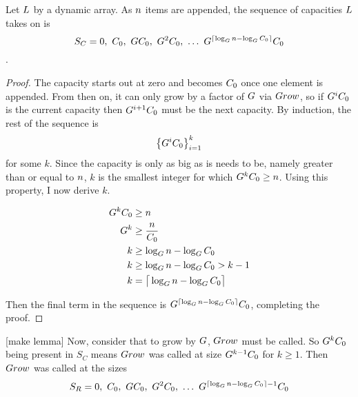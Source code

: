 \begin{lemma}
\label{CapacitySequence}
	Let $L$ by a dynamic array. As $n$ items are appended, the sequence of capacities $L$ takes on is $$S_C = 0,\ \InitCapacity,\ \GrowthFactor\InitCapacity,\ \GrowthFactor^2\InitCapacity,\ \ldots\ \GrowthFactor^{\lceil \log_{\GrowthFactor} \varnitems - \log_{\GrowthFactor} \InitCapacity \rceil}\InitCapacity$$.
\end{lemma}

\begin{proof}
	The capacity starts out at zero and becomes $C_0$ once one element is appended. From then on, it can only grow by a factor of $G$ via $Grow$, so if $G^iC_0$ is the current capacity then $G^{i + 1}C_0$ must be the next capacity. By induction, the rest of the sequence is $$\left\{ G^iC_0 \right\}_{i = 1}^k$$ for some $k$. Since the capacity is only as big as is needs to be, namely greater than or equal to $n$, $k$ is the smallest integer for which $G^kC_0 \geq n$. Using this property, I now derive $k$.
	
	\begin{align*}
	G^kC_0 &\geq n\\
	G^k &\geq \frac{n}{C_0}\\
	k &\geq \log_{G} n - \log_{G} C_0\\
	k &\geq \log_{G} n - \log_{G} C_0 > k - 1\\
	k &= \big\lceil \log_{G} n - \log_{G} C_0 \big\rceil
	\end{align*}
	
	Then the final term in the sequence is $G^{\lceil \log_{G} n - \log_{G} C_0 \rceil}C_0$, completing the proof.
\end{proof}

[make lemma]
Now, consider that to grow by $G$, $Grow$ must be called. So $G^kC_0$ being present in $S_C$ means $Grow$ was called at size $G^{k - 1}C_0$ for $k \geq 1$. Then $Grow$ was called at the sizes $$S_R = 0,\ \InitCapacity,\ \GrowthFactor\InitCapacity,\ \GrowthFactor^2\InitCapacity,\ \ldots\ \GrowthFactor^{\lceil \log_{\GrowthFactor} \varnitems - \log_{\GrowthFactor} \InitCapacity \rceil - 1}\InitCapacity$$

